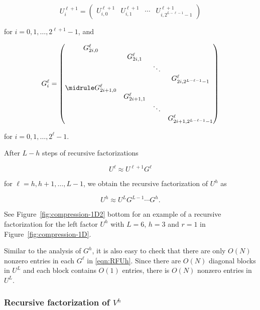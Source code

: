 \begin{equation*}
U_{i}^{\ell+1}=
\begin{pmatrix}
U^{\ell+1}_{i,0} & U^{\ell+1}_{i,1} & \cdots & U^{\ell+1}_{i,2^{L-\ell-1}-1}
\end{pmatrix}
\end{equation*}

for $i=0,1,\dots,2^{\ell+1}-1$, and

\begin{equation*}
G^{\ell}_{i}=
\begin{pmatrix}
G^{\ell}_{2i,0} & & &\\
 & G^{\ell}_{2i,1} & &\\
 & & \ddots &\\
 & & & G^{\ell}_{2i,2^{L-\ell-1}-1}\\
\midrule
G^{\ell}_{2i+1,0} & & &\\
 & G^{\ell}_{2i+1,1} & &\\
 & & \ddots &\\
 & & & G^{\ell}_{2i+1,2^{L-\ell-1}-1}
\end{pmatrix}
\end{equation*}

for $i=0,1,\dots,2^\ell-1$.

After $L-h$ steps of recursive factorizations

\begin{equation*}
U^\ell \approx U^{\ell+1}G^{\ell}
\end{equation*}

for $\ell=h,h+1,\dots,L-1$,
we obtain the recursive factorization of $U^h$ as

\begin{equation}
\label{eqn:RFUh}
U^h\approx U^{L}G^{L-1}\cdots G^{h}.
\end{equation}

See Figure~\ref{fig:compression-1D2} bottom for an example of a recursive factorization for the left factor $U^h$ with $L=6$, $h=3$ and $r=1$ in Figure~\ref{fig:compression-1D}.

Similar to the analysis of $G^{h}$, it is also easy to check that there are only $O(N)$ nonzero entries in each $G^{\ell}$
in \eqref{eqn:RFUh}.  Since there are $O(N)$ diagonal blocks in $U^L$ and each block contains $O(1)$ entries, there is $O(N)$ nonzero entries in $U^L$.

\subsubsection{Recursive factorization of $V^h$}
\label{sec:RCV}

